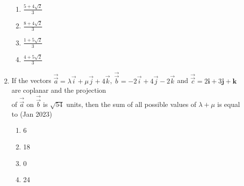 \documentclass[journal,12pt,onecolumn]{IEEEtran}
\theoremstyle{remark}
\begin{document}
\begin{enumerate}
\begin{multicols}{2}
\begin{enumerate}
    \item $\frac{5 + 4\sqrt{2}}{3}$\\
    \item $\frac{8 + 4\sqrt{2}}{3}$
    \item $\frac{1 + 5\sqrt{2}}{3}$\\
    \item $\frac{4 + 5\sqrt{2}}{3}$\\
\end{enumerate}
\end{multicols}

\item If the vectors $\overrightarrow{\vec{a}} = \lambda\vec{i} + \mu\vec{j} + 4\vec{k}$, $\overrightarrow{\vec{b}} = -2\vec{i} + 4\vec{j} -2\vec{k}$ and  $\overrightarrow{\vec{c}} = 2\mathbf{i} + 3\mathbf{j} + \mathbf{k}$ are coplanar and the projection\\ of  $\overrightarrow{\vec{a}}$ on $\overrightarrow{\vec{b}}$ is $\sqrt{54}$ units, then the sum of all possible values of $\lambda + \mu$ is equal to \hfill(Jan 2023)
\begin{multicols}{4}
    \begin{enumerate}
    \item 6
    \item 18
    \item 0 
    \item 24
\end{enumerate}
\end{multicols}
\end{enumerate}
\end{document}
